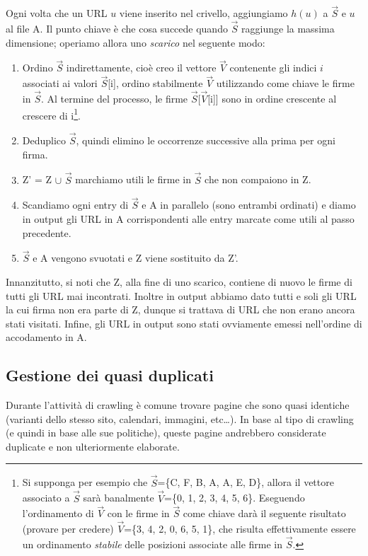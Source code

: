 Ogni volta che un URL $u$ viene inserito nel crivello, aggiungiamo $h(u)$ a $\vec{S}$ e $u$ al file A. Il punto chiave è che cosa succede quando $\vec{S}$ raggiunge la massima dimensione; operiamo allora uno \textit{scarico} nel seguente modo:
\begin{enumerate}
    \item Ordino $\vec{S}$ indirettamente, cioè creo il vettore $\vec{V}$ contenente gli indici $i$ associati ai valori $\vec{S}$[i], ordino stabilmente $\vec{V}$ utilizzando come chiave le firme in $\vec{S}$. Al termine del processo, le firme $\vec{S}$[$\vec{V}$[i]] sono in ordine crescente al crescere di i\footnote{Si supponga per esempio che $\vec{S}$=\{C, F, B, A, A, E, D\}, allora il vettore associato a $\vec{S}$ sarà banalmente $\vec{V}$=\{0, 1, 2, 3, 4, 5, 6\}. Eseguendo l'ordinamento di $\vec{V}$ con le firme in $\vec{S}$ come chiave darà il seguente risultato (provare per credere) $\vec{V}$=\{3, 4, 2, 0, 6, 5, 1\}, che risulta effettivamente essere un ordinamento \textit{stabile} delle posizioni associate alle firme in $\vec{S}$.}.
    \item Deduplico $\vec{S}$, quindi elimino le occorrenze successive alla prima per ogni firma.
    \item Z' = Z $\cup$ $\vec{S}$ marchiamo utili le firme in $\vec{S}$ che non compaiono in Z.
    \item Scandiamo ogni entry di $\vec{S}$ e A in parallelo (sono entrambi ordinati) e diamo in output gli URL in A corrispondenti alle entry marcate come utili al passo precedente.
    \item $\vec{S}$ e A vengono svuotati e Z viene sostituito da Z'.
\end{enumerate}
Innanzitutto, si noti che Z, alla fine di uno scarico, contiene di nuovo le firme di tutti gli URL mai incontrati. Inoltre in output abbiamo dato tutti e soli gli URL la cui firma non era parte di Z, dunque si trattava di URL che non erano ancora stati visitati. Infine, gli URL in output sono stati ovviamente emessi nell'ordine di accodamento in A.
\subsection{Gestione dei quasi duplicati}
Durante l'attività di crawling è comune trovare pagine che sono quasi identiche (varianti dello stesso sito, calendari, immagini, etc\dots). In base al tipo di crawling (e quindi in base alle sue politiche), queste pagine andrebbero considerate duplicate e non ulteriormente elaborate.

